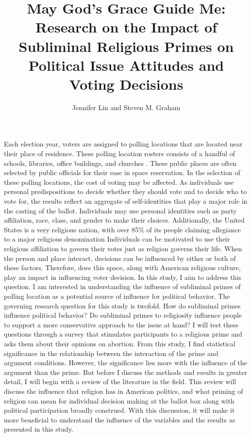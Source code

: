 \documentclass[letterpaper,man,natbib,noextraspace,12pt]{apa6}  %
\title{\large{May God’s Grace Guide Me: Research on the Impact of Subliminal Religious Primes on Political Issue Attitudes and Voting Decisions}}
\author{Jennifer Lin and Steven M. Graham}
\affiliation{New College of Florida}
\begin{document}
\maketitle

Each election year, voters are assigned to polling locations that are located near their place of residence. These polling location rosters consists of a handful of schools, libraries, office buildings, and churches \citep{barreto_are_2009}. These public places are often selected by public officials for their ease in space reservation. In the selection of these polling locations, the cost of voting may be affected. As individuals use personal predispositions to decide whether they should vote and to decide who to vote for, the results reflect an aggregate of self-identities that play a major role in the casting of the ballot. Individuals may use personal identities such as party affiliation, race, class, and gender to make their choices. Additionally, the United States is a very religious nation, with over 85\% of its people claiming allegiance to a major religious denomination \citep{domke_god_2008, putnam_american_2010} Individuals can be motivated to use their religious affiliation to govern their votes just as religion governs their life. When the person and place interact, decisions can be influenced by either or both of these factors. Therefore, does this space, along with American religious culture, play an impact in influencing voter decision. In this study, I aim to address this question. I am interested in understanding the influence of subliminal primes of polling location as a potential source of influence for political behavior. The governing research question for this study is twofold. How do subliminal primes influence political behavior? Do subliminal primes to religiosity influence people to support a more conservative approach to the issue at hand? I will test these questions through a survey that stimulates participants to a religious prime and asks them about their opinions on abortion. From this study, I find statistical significance in the relationship between the interaction of the prime and argument conditions. However, the significance lies more with the influence of the argument than the prime. But before I discuss the methods and results in greater detail, I will begin with a review of the literature in the field. This review will discuss the influence that religion has in American politics, and what priming of religion can mean for individual decision making at the ballot box along with political participation broadly construed. With this discussion, it will make it more beneficial to understand the influence of the variables and the results as presented in this study.
\end{document}
